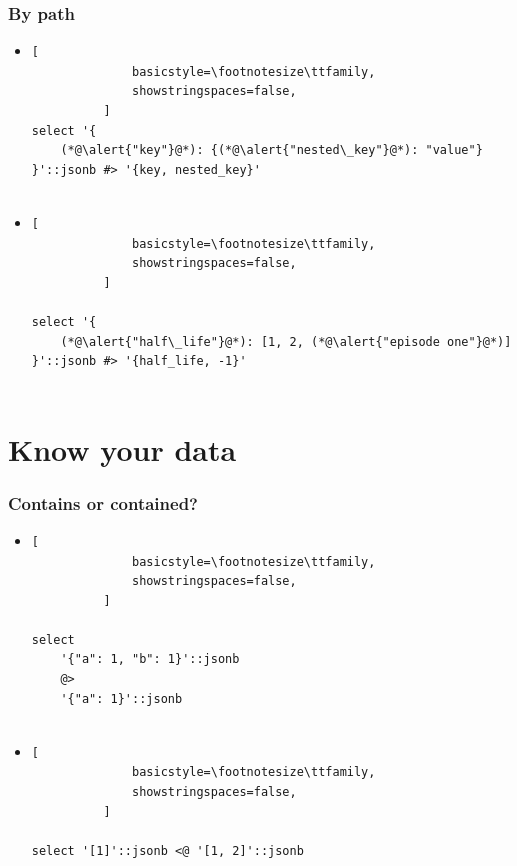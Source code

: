 \documentclass[14pt, compress]{beamer}
\begin{document}
\begin{frame}[fragile]
  \frametitle{By path}

  \begin{itemize}
      \item
          \begin{lstlisting}[
              basicstyle=\footnotesize\ttfamily,
              showstringspaces=false,
          ]
select '{
    (*@\alert{"key"}@*): {(*@\alert{"nested\_key"}@*): "value"}
}'::jsonb #> '{key, nested_key}'
         
          \end{lstlisting}

      \item
          \begin{lstlisting}[
              basicstyle=\footnotesize\ttfamily,
              showstringspaces=false,
          ]

select '{
    (*@\alert{"half\_life"}@*): [1, 2, (*@\alert{"episode one"}@*)]
}'::jsonb #> '{half_life, -1}'
         
          \end{lstlisting}

  \end{itemize}

\end{frame}

\section{Know your data}

\begin{frame}[fragile]
  \frametitle{Contains or contained?}

  \begin{itemize}
      \item
          \begin{lstlisting}[
              basicstyle=\footnotesize\ttfamily,
              showstringspaces=false,
          ]

select
    '{"a": 1, "b": 1}'::jsonb
    @>
    '{"a": 1}'::jsonb
         
          \end{lstlisting}

      \item
          \begin{lstlisting}[
              basicstyle=\footnotesize\ttfamily,
              showstringspaces=false,
          ]

select '[1]'::jsonb <@ '[1, 2]'::jsonb
         
          \end{lstlisting}


  \end{itemize}

\end{frame}
\end{document}
